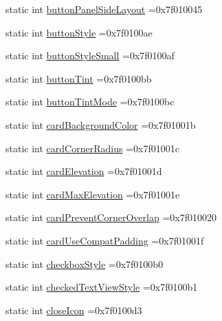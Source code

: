 \begin{DoxyCompactItemize}
static int \hyperlink{classandroid_1_1support_1_1v7_1_1recyclerview_1_1R_1_1attr_ad5d2a4ac315975a2cbbd53dfdf90bc62}{button\+Panel\+Side\+Layout} =0x7f010045
\item 
static int \hyperlink{classandroid_1_1support_1_1v7_1_1recyclerview_1_1R_1_1attr_abb64edc003d10793d848b67f4f7b4deb}{button\+Style} =0x7f0100ae
\item 
static int \hyperlink{classandroid_1_1support_1_1v7_1_1recyclerview_1_1R_1_1attr_a56d49d09fb4efe84d271cb3f473a2802}{button\+Style\+Small} =0x7f0100af
\item 
static int \hyperlink{classandroid_1_1support_1_1v7_1_1recyclerview_1_1R_1_1attr_a73c37739f10b2e3054fe2d2db7c19b96}{button\+Tint} =0x7f0100bb
\item 
static int \hyperlink{classandroid_1_1support_1_1v7_1_1recyclerview_1_1R_1_1attr_ade22c6179aa64bcf0e9a978032dab998}{button\+Tint\+Mode} =0x7f0100bc
\item 
static int \hyperlink{classandroid_1_1support_1_1v7_1_1recyclerview_1_1R_1_1attr_afa0014df296c81eabcf137167588e119}{card\+Background\+Color} =0x7f01001b
\item 
static int \hyperlink{classandroid_1_1support_1_1v7_1_1recyclerview_1_1R_1_1attr_a3b1b87ba8de6ddac0572640243b7f349}{card\+Corner\+Radius} =0x7f01001c
\item 
static int \hyperlink{classandroid_1_1support_1_1v7_1_1recyclerview_1_1R_1_1attr_a2f4bd3834ca1ae015c41fec2bc0b4606}{card\+Elevation} =0x7f01001d
\item 
static int \hyperlink{classandroid_1_1support_1_1v7_1_1recyclerview_1_1R_1_1attr_a5f09c1b0941cb2b74cd3654916a43c9c}{card\+Max\+Elevation} =0x7f01001e
\item 
static int \hyperlink{classandroid_1_1support_1_1v7_1_1recyclerview_1_1R_1_1attr_a29b8196e3b63cdcec598aece9a812243}{card\+Prevent\+Corner\+Overlap} =0x7f010020
\item 
static int \hyperlink{classandroid_1_1support_1_1v7_1_1recyclerview_1_1R_1_1attr_ab3c2e51e3f27b6ff7ff09edcbed877fe}{card\+Use\+Compat\+Padding} =0x7f01001f
\item 
static int \hyperlink{classandroid_1_1support_1_1v7_1_1recyclerview_1_1R_1_1attr_a6f9c5ed1b6b8021bded1325c40a0a778}{checkbox\+Style} =0x7f0100b0
\item 
static int \hyperlink{classandroid_1_1support_1_1v7_1_1recyclerview_1_1R_1_1attr_ade061a8ea58742cf355af7a0056e6181}{checked\+Text\+View\+Style} =0x7f0100b1
\item 
static int \hyperlink{classandroid_1_1support_1_1v7_1_1recyclerview_1_1R_1_1attr_a56d53d8df869f5ae22fa2a44f44cf637}{close\+Icon} =0x7f0100d3

\end{DoxyCompactItemize}
